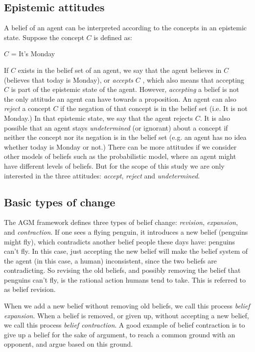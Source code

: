 \subsection{Epistemic attitudes}
\label{epistemicAttitudes}
A belief of an agent can be interpreted according to the concepts in an epistemic state. Suppose the concept $C$ is defined as:
\begin{center}
$C$ = It's Monday
\end{center}
If $C$ exists in the belief set of an agent, we say that the agent believes in $C$ (believes that today is Monday), or \textit{accepts} $C$ \cite{flux}, which also means that accepting $C$ is part of the epistemic state of the agent. However, \textit{accepting} a belief is not the only attitude an agent can have towards a proposition. An agent can also \textit{reject} a concept $C$ if the negation of that concept is in the belief set (i.e. It is not Monday.) In that epistemic state, we say that the agent rejects $C$. It is also possible that an agent stays \textit{undetermined} (or ignorant) about a concept if neither the concept nor its negation is in the belief set (e.g. an agent has no idea whether today is Monday or not.) There can be more attitudes if we consider other models of beliefs such as the probabilistic model, where an agent might have different levels of beliefs. But for the scope of this study we are only interested in the three attitudes: \textit{accept}, \textit{reject} and \textit{undetermined}.

\subsection{Basic types of change}
The AGM framework defines three types of belief change: \textit{revision}, \textit{expansion}, and \textit{contraction}. If one sees a flying penguin, it introduces a new belief (penguins might fly), which contradicts another belief people these days have: penguins can't fly. In this case, just accepting the new belief will make the belief system of the agent (in this case, a human) inconsistent, since the two beliefs are contradicting. So revising the old beliefs, and possibly removing the belief that penguins can't fly, is the rational action humans tend to take. This is referred to as belief revision.

When we add a new belief without removing old beliefs, we call this process \textit{belief expansion}. When a belief is removed, or given up, without accepting a new belief, we call this process \textit{belief contraction}. A good example of belief contraction is to give up a belief for the sake of argument, to reach a common ground with an opponent, and argue based on this ground.

